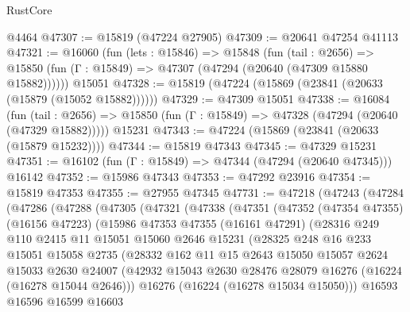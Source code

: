 \begin{lexlean}{RustCore}
\begin{coremodule}
    @4464
@47307 := @15819 (@47224 @27905)
@47309 := @20641 @47254 @41113
@47321 := @16060
    (fun (lets : @15846) =>
    @15848
      (fun (tail : @2656) =>
      @15850 (fun (Γ : @15849) => @47307 (@47294 (@20640 (@47309 @15880 @15882))))))
    @15051
@47328 := @15819 (@47224 (@15869 (@23841 (@20633 (@15879 (@15052 @15882))))))
@47329 := @47309 @15051
@47338 := @16084
    (fun (tail : @2656) => @15850 (fun (Γ : @15849) => @47328 (@47294 (@20640 (@47329 @15882)))))
    @15231
@47343 := @47224 (@15869 (@23841 (@20633 (@15879 @15232))))
@47344 := @15819 @47343
@47345 := @47329 @15231
@47351 := @16102 (fun (Γ : @15849) => @47344 (@47294 (@20640 @47345))) @16142
@47352 := @15986 @47343
@47353 := @47292 @23916
@47354 := @15819 @47353
@47355 := @27955 @47345
@47731 := @47218
    (@47243
      (@47284
        (@47286
          (@47288
            (@47305
              (@47321
                (@47338
                  (@47351
                    (@47352
                      (@47354 @47355)
                      (@16156 @47223)
                      (@15986
                        @47353
                        @47355
                        (@16161 @47291)
                        (@28316
                          @249
                          @110
                          @2415
                          @11
                          @15051
                          @15060
                          @2646
                          @15231
                          (@28325
                            @248
                            @16
                            @233
                            @15051
                            @15058
                            @2735
                            (@28332
                              @162
                              @11
                              @15
                              @2643
                              @15050
                              @15057
                              @2624
                              @15033
                              @2630
                              @24007
                              (@42932
                                @15043
                                @2630
                                @28476
                                @28079
                                @16276
                                (@16224 (@16278 @15044 @2646)))
                              @16276
                              (@16224 (@16278 @15034 @15050)))
                            @16593
                            @16596
                            @16599
                            @16603

\end{coremodule}
\end{lexlean}
